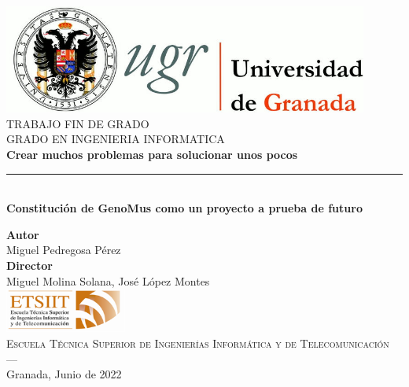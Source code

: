 \begin{titlepage}
\newlength{\centeroffset}
\setlength{\centeroffset}{-0.5\oddsidemargin}
\addtolength{\centeroffset}{0.5\evensidemargin}
\thispagestyle{empty}

\noindent\hspace*{\centeroffset}\begin{minipage}{\textwidth}

\centering
\includegraphics[width=0.9\textwidth]{logos/logo_ugr.jpg}\\[1.4cm]

\textsc{ \Large TRABAJO FIN DE GRADO\\[0.2cm]}
\textsc{ GRADO EN INGENIERIA INFORMATICA}\\[1cm]

{\Huge\bfseries Crear muchos problemas para solucionar unos pocos\\}
\noindent\rule[-1ex]{\textwidth}{3pt}\\[3.5ex]
{\large\bfseries Constitución de GenoMus como un proyecto a prueba de futuro }
\end{minipage}

\vspace{2.5cm}
\noindent\hspace*{\centeroffset}
\begin{minipage}{\textwidth}
\centering

\textbf{Autor}\\ {Miguel Pedregosa Pérez}\\[2.5ex]
\textbf{Director}\\ {Miguel Molina Solana, José López Montes}\\[2cm]
\includegraphics[width=0.3\textwidth]{logos/etsiit_logo.png}\\[0.1cm]
\textsc{Escuela Técnica Superior de Ingenierías Informática y de Telecomunicación}\\
\textsc{---}\\
Granada, Junio de 2022
\end{minipage}
\end{titlepage}
